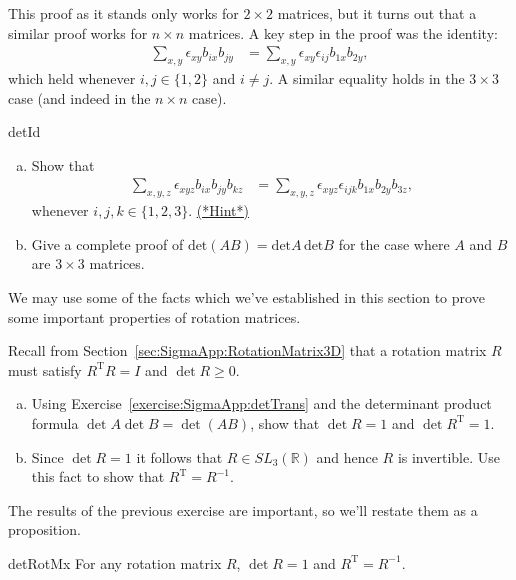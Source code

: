 This proof as it stands only works for $2 \times 2$ matrices, but it turns out that a similar proof works for $n \times n$ matrices.  A key step in the proof was the identity:
\begin{align*}
\sum_{x,y} \epsilon_{xy} b_{ix}b_{jy}&= \sum_{x,y} \epsilon_{xy}\epsilon_{ij} b_{1x}b_{2y},
\end{align*}
which held whenever $i,j \in \{1,2\}$ and $i \neq j$. A similar equality holds in the $3 \times 3$ case (and indeed in the $n \times n$ case).

\begin{exercise}{detId}
\begin{enumerate}[(a)]
\item
Show that
\begin{align*}
\sum_{x,y,z}  \epsilon_{xyz} b_{ix}b_{jy}b_{kz}&=\sum_{x,y,z} \epsilon_{xyz}\epsilon_{ijk} b_{1x}b_{2y}b_{3z},
\end{align*}
whenever $i,j,k \in \{1,2,3\}$.
\hyperref[sec:SigmaNotation:Hints]{(*Hint*)} 
\item
Give a complete proof of $\text{det}(AB)= \text{det}A \,\text{det}B$ for the case where $A$ and $B$ are $3 \times 3$ matrices.
\end{enumerate}
\end{exercise}

We may use some of the facts which we've established in this section to prove some important properties of rotation matrices. 

\begin{exercise}{}
Recall from Section~\ref{sec:SigmaApp:RotationMatrix3D} that a rotation matrix $R$ must satisfy $R^{\text{T}} R = I$ and $\det R \ge 0$.
\begin{enumerate}[(a)]
\item
Using Exercise~\ref{exercise:SigmaApp:detTrans} and the determinant product formula $\det A \det B = \det(AB)$, show that $\det R = 1$ and $\det R^{\text{T}}=1$. 
\item
Since $\det R = 1$ it follows that $R \in SL_3(\mathbb{R})$ and hence $R$ is invertible. Use this fact to show that $R^{\text{T}} = R^{-1}$.
\end{enumerate}
\end{exercise}

The results of the previous exercise are important, so we'll restate them as a proposition.

\begin{prop}{detRotMx} For any rotation matrix $R$, $\det R = 1$ and $R^{\text{T}} = R^{-1}$.
\end{prop}

